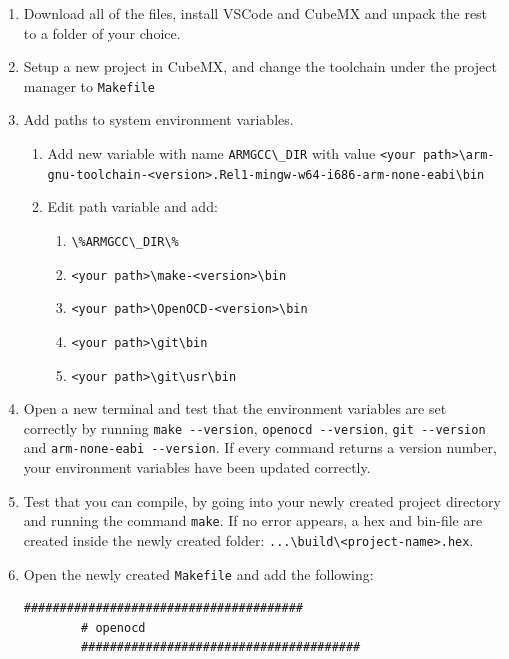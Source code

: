 \begin{appendices}
\begin{enumerate}
    \item Download all of the files, install VSCode and CubeMX and unpack the rest to a folder of your choice.
    \item Setup a new project in CubeMX, and change the toolchain under the project manager to \lstinline[style=bash]{Makefile}
    \item Add paths to system environment variables.
    \begin{enumerate}
        \item Add new variable with name \lstinline[style=bash]{ARMGCC\_DIR} with value \lstinline[style=bash]{<your path>\arm-gnu-toolchain-<version>.Rel1-mingw-w64-i686-arm-none-eabi\bin}
        \item Edit path variable and add:
        \begin{enumerate}
            \item \lstinline[style=bash]{\%ARMGCC\_DIR\%}
            \item \lstinline[style=bash]{<your path>\make-<version>\bin}
            \item \lstinline[style=bash]{<your path>\OpenOCD-<version>\bin}
            \item \lstinline[style=bash]{<your path>\git\bin}
            \item \lstinline[style=bash]{<your path>\git\usr\bin}
        \end{enumerate}
    \end{enumerate}
    \item Open a new terminal and test that the environment variables are set correctly by running \lstinline[style=bash]{make --version}, \lstinline[style=bash]{openocd --version}, \lstinline[style=bash]{git --version} and \lstinline[style=bash]{arm-none-eabi --version}. If every command returns a version number, your environment variables have been updated correctly.
    \item Test that you can compile, by going into your newly created project directory and running the command \lstinline[style=bash]{make}.
    If no error appears, a hex and bin-file are created inside the newly created folder: \lstinline[style=bash]{...\build\<project-name>.hex}.
    \item Open the newly created \lstinline[style=bash]{Makefile} and add the following:
    \begin{lstlisting}[style=bash]
        #######################################
        # openocd
        #######################################

\end{lstlisting}
\end{enumerate}
\end{appendices}

